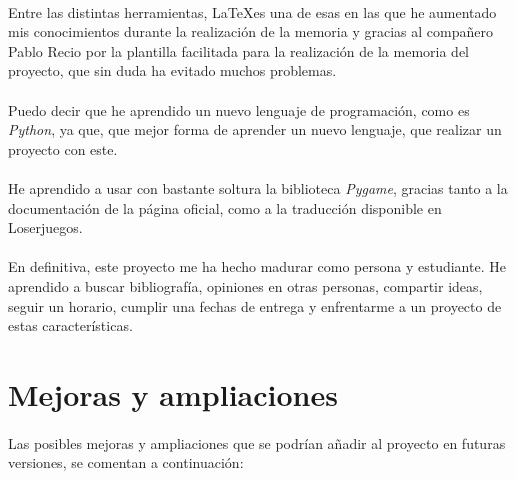 \paragraph{}
Entre las distintas herramientas, \LaTeX es una de esas en las que he aumentado mis conocimientos durante la realización de la 
memoria y gracias al compañero Pablo Recio por la plantilla facilitada para la realización de la memoria del proyecto, que sin duda
ha evitado muchos problemas.

\paragraph{}
Puedo decir que he aprendido un nuevo lenguaje de programación, como es \emph{Python}, ya que, que mejor forma de aprender un 
nuevo lenguaje, que realizar un proyecto con este.

\paragraph{}
He aprendido a usar con bastante soltura la biblioteca \emph{Pygame}, gracias tanto a la documentación de la página oficial, como
a la traducción disponible en Loserjuegos.

\paragraph{}
En definitiva, este proyecto me ha hecho madurar como persona y estudiante. He aprendido a buscar bibliografía, opiniones en otras
personas, compartir ideas, seguir un horario, cumplir una fechas de entrega y enfrentarme a un proyecto de estas características.

\section{Mejoras y ampliaciones}

\paragraph{}
Las posibles mejoras y ampliaciones que se podrían añadir al proyecto en futuras versiones, se comentan a continuación:

